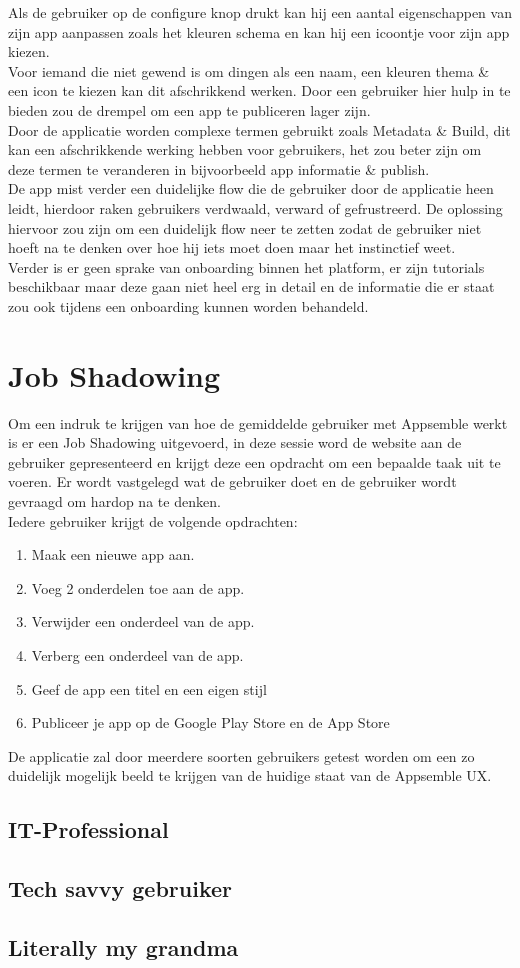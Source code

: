 Als de gebruiker op de configure knop drukt kan hij een aantal eigenschappen van zijn app 
aanpassen zoals het kleuren schema en kan hij een icoontje voor zijn app kiezen.\\
\newline
Voor iemand die niet gewend is om dingen als een naam, een kleuren thema \& een icon te kiezen kan dit afschrikkend werken. Door een gebruiker hier hulp in te bieden zou de drempel om een app te publiceren lager zijn. \\
\newline
Door de applicatie worden complexe termen gebruikt zoals Metadata \& Build, dit kan een afschrikkende werking hebben voor gebruikers, het zou beter zijn om deze termen te veranderen in bijvoorbeeld app informatie \& publish.\\
\newline
De app mist verder een duidelijke flow die de gebruiker door de applicatie heen leidt, hierdoor raken gebruikers verdwaald, verward of gefrustreerd. De oplossing hiervoor zou zijn om een duidelijk flow neer te zetten zodat de gebruiker niet hoeft na te denken over hoe hij iets moet doen maar het instinctief weet.\\
\newline
Verder is er geen sprake van onboarding binnen het platform, er zijn tutorials beschikbaar maar deze gaan niet heel erg in detail en de informatie die er staat zou ook tijdens een onboarding kunnen worden behandeld.\\
\section{Job Shadowing}
Om een indruk te krijgen van hoe de gemiddelde gebruiker met Appsemble werkt is er een Job Shadowing uitgevoerd, in deze sessie word de website aan de gebruiker gepresenteerd en krijgt deze een opdracht om een bepaalde taak uit te voeren. Er wordt vastgelegd wat de gebruiker doet en de gebruiker wordt gevraagd om hardop na te denken.\\
\newline
Iedere gebruiker krijgt de volgende opdrachten:
\begin{enumerate}
	\item Maak een nieuwe app aan.
	\item Voeg 2 onderdelen toe aan de app.
	\item Verwijder een onderdeel van de app.
	\item Verberg een onderdeel van de app.
	\item Geef de app een titel en een eigen stijl
	\item Publiceer je app op de Google Play Store en de App Store
\end{enumerate}
De applicatie zal door meerdere soorten gebruikers getest worden om een zo duidelijk mogelijk beeld te krijgen van de huidige staat van de Appsemble UX.
\subsection{IT-Professional}
\subsection{Tech savvy gebruiker}
\subsection{Literally my grandma}
